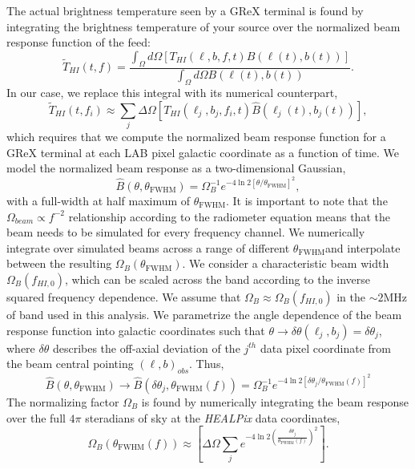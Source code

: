 The actual brightness temperature seen by a GReX terminal is found by integrating the brightness temperature of your source over the normalized beam response function of the feed:
\begin{equation*}
    \widetilde{T}_{HI}(t,f) = \frac{\int_\Omega d\Omega \left[T_{HI}(\ell, b, f, t) B(\ell(t),b(t))\right]}{\int_\Omega d\Omega B(\ell(t),b(t))}.
\end{equation*}
In our case, we replace this integral with its numerical counterpart,
\begin{equation*}
    \widetilde{T}_{HI}(t,f_i) \approx \sum_j \Delta\Omega\left[T_{HI}(\ell_j, b_j, f_i, t) \hat{B}(\ell_j(t),b_j(t))\right],
\end{equation*}
which requires that we compute the normalized beam response function for a GReX terminal at each LAB pixel galactic coordinate as a function of time. 
We model the normalized beam response as a two-dimensional Gaussian,
\begin{equation*}
    \hat{B}(\theta,\theta_\text{FWHM})=\Omega_{B}^{-1}e^{-4\ln2[\theta/\theta_\text{FWHM}]^2},
\end{equation*}
with a full-width at half maximum of $\theta_\text{FWHM}$. 
It is important to note that the $\Omega_{beam}\propto f^{-2}$ relationship according to the radiometer equation means that the beam needs to be simulated for every frequency channel. 
We numerically integrate over simulated beams across a range of different $\theta_\text{FWHM}$and interpolate between the resulting $\Omega_B(\theta_\text{FWHM})$. 
We consider a characteristic beam width $\Omega_B(f_{HI,0})$, which can be scaled across the band according to the inverse squared frequency dependence. 
We assume that $\Omega_B\approx\Omega_B(f_{HI,0})$ in the $\sim2\text{MHz}$ of band used in this analysis. 
We parametrize the angle dependence of the beam response function into galactic coordinates such that $\theta\to\delta\theta(\ell_j,b_j)=\delta\theta_j$, where $\delta\theta$ describes the off-axial deviation of the $j^{th}$ data pixel coordinate from the beam central pointing $(\ell,b)_{obs}$. 
Thus,
\begin{equation*}
    \hat{B}(\theta,\theta_\text{FWHM})\to \hat{B}(\delta\theta_j, \theta_\text{FWHM}(f))=\Omega_{B}^{-1}e^{-4\ln2[\delta\theta_j/\theta_\text{FWHM}(f)]^2}
\end{equation*}
The normalizing factor $\Omega_B$ is found by numerically integrating the beam response over the full $4\pi$ steradians of sky at the \textit{HEALPix} data coordinates,
\begin{equation*}
    \Omega_{B}(\theta_\text{FWHM}(f)) \approx \left[\Delta\Omega\sum_j e^{-4\ln2\left(\frac{\delta\theta_j}{\theta_\text{FWHM}(f)}\right)^2}\right].
\end{equation*}
